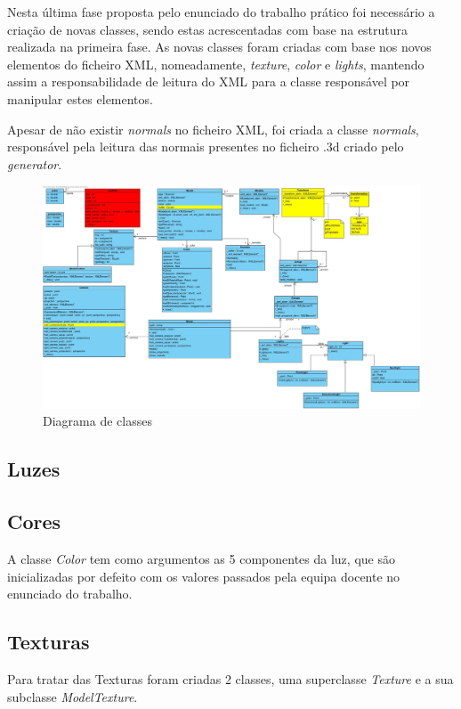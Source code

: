 \documentclass[relatorio.tex]{subfiles}
\begin{document}
Nesta última fase proposta pelo enunciado do trabalho prático foi necessário a 
criação de novas classes, sendo estas acrescentadas com base na estrutura realizada
na primeira fase. As novas classes foram criadas com base nos novos elementos do ficheiro
XML, nomeadamente, \textit{texture}, \textit{color} e \textit{lights}, mantendo assim a 
responsabilidade de leitura do XML para a classe responsável por manipular estes elementos.

Apesar de não existir \textit{normals} no ficheiro XML, foi criada a classe \textit{normals},
responsável pela leitura das normais presentes no ficheiro .3d criado pelo \textit{generator}.

\begin{landscape}
    \begin{figure}
        \centering
        \includegraphics[width=\linewidth]{assets/classe.jpg}
        \caption{Diagrama de classes} \label{fig:dig_classes}
    \end{figure}
\end{landscape}

\subsection{Luzes}

\subsection{Cores}
A classe \textit{Color} tem como argumentos as 5 componentes da luz,
que são inicializadas por defeito com os valores passados pela equipa docente
no enunciado do trabalho. 

\subsection{Texturas}
Para tratar das Texturas foram criadas 2 classes, uma superclasse
\textit{Texture} e a sua subclasse \textit{ModelTexture}.
\end{document}
